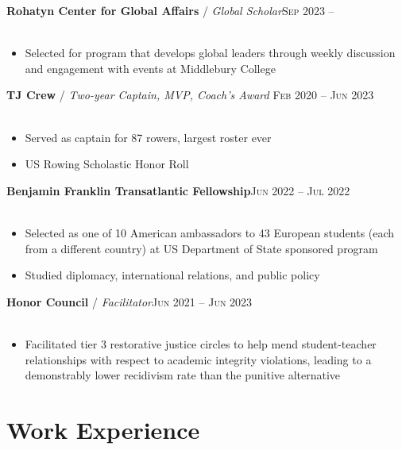 \documentclass[12pt, a4paper]{article}
\begin{document}
\textbf{Rohatyn Center for Global Affairs} / \textit{Global Scholar}\hfill\textsc{Sep 2023 --}\\\
\begin{itemize}
    \vspace{-8mm}
    \item Selected for program that develops global leaders through weekly discussion and engagement with events at Middlebury College
\end{itemize}

\textbf{TJ Crew} / \textit{Two-year Captain, MVP, Coach's Award }\hfill\textsc{Feb 2020 -- Jun 2023}\\\
\begin{itemize}
    \vspace{-8mm}
    \item Served as captain for 87 rowers, largest roster ever
    \item US Rowing Scholastic Honor Roll
\end{itemize}

\textbf{Benjamin Franklin Transatlantic Fellowship}\hfill\textsc{Jun 2022 -- Jul 2022}\\\
\begin{itemize}
    \vspace{-8mm}
    \item Selected as one of 10 American ambassadors to 43 European students (each from a different country) at US Department of State sponsored program
    \item Studied diplomacy, international relations, and public policy
\end{itemize}

\textbf{Honor Council} / \textit{Facilitator}\hfill\textsc{Jun 2021 -- Jun 2023}\\\
\begin{itemize}
    \vspace{-8mm}
    \item Facilitated tier 3 restorative justice circles to help mend student-teacher relationships with respect to academic integrity violations, leading to a demonstrably lower recidivism rate than the punitive alternative
\end{itemize}

\vspace{-8mm}
\section*{Work Experience}
\vspace{-2mm}
\end{document}
